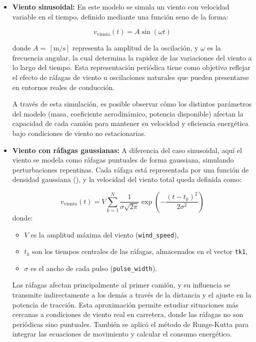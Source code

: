 \documentclass[11pt,stdletter,orderfromtodate,sigleft,twoside]{report}
\begin{document}
\begin{itemize}
    \item \textbf{Viento sinusoidal:}  
   En este modelo se simula un viento con velocidad variable en el tiempo, definido mediante una función seno de la forma:

    \[
    v_\text{viento}(t) = A \sin(\omega t)
    \]

    donde \( A =  \, [\text{m/s}] \) representa la amplitud de la oscilación, y \( \omega \) es la frecuencia angular, la cual determina la rapidez de las variaciones del viento a lo largo del tiempo. Esta representación periódica tiene como objetivo reflejar el efecto de ráfagas de viento u oscilaciones naturales que pueden presentarse en entornos reales de conducción.
    
    A través de esta simulación, es posible observar cómo los distintos parámetros del modelo (masa, coeficiente aerodinámico, potencia disponible) afectan la capacidad de cada camión para mantener su velocidad y eficiencia energética bajo condiciones de viento no estacionarias.
    
    \item \textbf{Viento con ráfagas gaussianas:}  
    A diferencia del caso sinusoidal, aquí el viento se modela como ráfagas puntuales de forma gaussiana, simulando perturbaciones repentinas. Cada ráfaga está representada por una función de densidad gaussiana (\cite{pulsoGauss}), y la velocidad del viento total queda definida como:

    \[
    v_{\text{viento}}(t) = V \sum_{k=1}^{N} \frac{1}{\sigma \sqrt{2\pi}} \exp\left(-\frac{(t - t_k)^2}{2\sigma^2} \right)
    \]
    donde:
    \begin{itemize}
        \item \( V \) es la amplitud máxima del viento (\texttt{wind\_speed}),
        \item \( t_k \) son los tiempos centrales de las ráfagas, almacenados en el vector \texttt{tk1},
        \item \( \sigma \) es el ancho de cada pulso (\texttt{pulse\_width}).
    \end{itemize}
     Las ráfagas afectan principalmente al primer camión, y su influencia se transmite indirectamente a los demás a través de la distancia y el ajuste en la potencia de tracción. Esta aproximación permite estudiar situaciones más cercanas a condiciones de viento real en carretera, donde las ráfagas no son periódicas sino puntuales. También se aplicó el método de Runge-Kutta para integrar las ecuaciones de movimiento y calcular el consumo energético.

     
\end{itemize}
\end{document}
